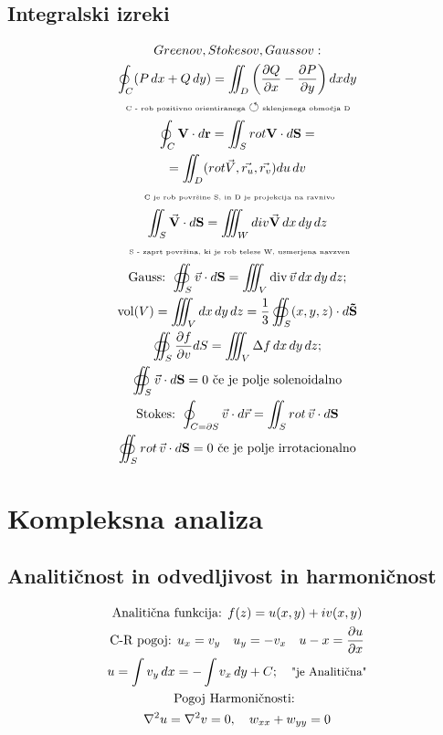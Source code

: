 \documentclass[a4paper,fleqn]{article} %
\begin{document}
\subsection*{Integralski izreki}
\begin{gather*}
    \textcolor{black}{Greenov, Stokesov, Gaussov: }\\
     \oint_C (P \, dx + Q \, dy) = \iint_D \left(\frac{\partial Q}{\partial x} - \frac{\partial P}{\partial y}\right) dxdy\\ 
    \text{ \tiny C - rob pozitivno orientiranega} \circlearrowleft \text{\tiny sklenjenega območja D } \\
    \oint_C \mathbf{V} \cdot d\mathbf{r} = \iint_S rot \mathbf{V} \cdot d\mathbf{S} = \\= \iint_D (rot \vec{V},\vec{r_u},\vec{r_v})du \, dv\\
    \text{ \tiny C je rob površine S, in D je projekcija na ravnivo}\\
    \iint_S \vec{\mathbf{V}} \cdot d\mathbf{S} = \iiint_W div \vec{\mathbf{V}} \, dx \, dy \, dz\\
    \text{ \tiny S - zaprt površina, ki je rob telese W, usmerjena navzven} \\
    \text{Gauss: } \oiint_S  \vec{v} \cdot d\mathbf{S} = \iiint_V \text{div}\,\vec{v}\,dx\,dy\,dz; \\ 
    \text{vol}(V) = \iiint_V dx\,dy\,dz = \frac{1}{3}\oiint_S(x,y,z) \cdot d\mathbf{\vec{S}}\\
    \oiint_S \frac{\partial f}{\partial v} dS = \iiint_V \Delta f \, dx\,dy\,dz; \\ 
    \oiint_S \vec{v} \cdot d\mathbf{S} = 0 \text{ če je polje solenoidalno} \\
    \text{Stokes: } \oint_{C = \partial S} \vec{v} \cdot d\vec{r} = \iint_S rot \, \vec{v} \cdot d\mathbf{S}\\
    \oiint_S rot \, \vec{v} \cdot d\mathbf{S} = 0 \text{ če je polje irrotacionalno}
\end{gather*}

\section*{Kompleksna analiza}
\subsection*{Analitičnost in odvedljivost in harmoničnost}
\begin{gather*}
    \text{Analitična funkcija: } f(z) = u(x,y) + iv(x,y) \\
    \text{C-R pogoj: } u_x = v_y \quad u_y = -v_x \quad u-x = \frac{\partial u}{\partial x} \\
    u = \int v _y \, dx = - \int v _x \, dy + C; \quad \text{\small "je Analitična"}\\
    \text{Pogoj Harmoničnosti: }\\ 
    \nabla^2 u = \nabla^2 v = 0, \quad w _{xx} + w _{yy} = 0
\end{gather*}
\end{document}
